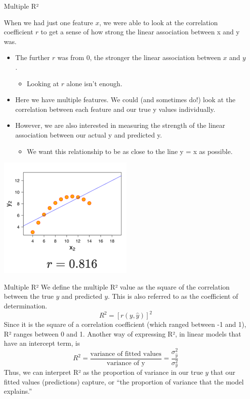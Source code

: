 \documentclass[aspectratio=169]{../latex_main/tntbeamer}  %
\begin{document}
	\begin{frame}{Multiple R²}
	
	    When we had just one feature $x$, we were able to look at the correlation coefficient $r$ to get a sense of how strong the linear association between x and y was. 
	    
	    \begin{itemize}
	        \item The further $r$ was from 0, the stronger the linear association between $x$ and $y$.
	        \begin{itemize}
	            \item Looking at $r$ alone isn’t enough. 
	        \end{itemize}
	        \item Here we have multiple features. We could (and sometimes do!) look at the correlation between each feature and our true y values individually.
	        \item However, we are also interested in measuring the strength of the linear association between our actual y and predicted y.
	        \begin{itemize}
	            \item We want this relationship to be as close to the line y = x as possible.
	        \end{itemize}
	    \end{itemize}
	    
	        \centering
	        \includegraphics[scale=.4]{Bild13}
	   
	\end{frame}
	
	
	\begin{frame}{Multiple R²}
	   We define the multiple R² value as the square of the correlation between the true $y$ and predicted $y$. This is also referred to as the coefficient of determination.
	    \begin{equation*}
	        R^2 = [r(y,\hat{y})]^2
	    \end{equation*}
	    Since it is the square of a correlation coefficient (which ranged between -1 and 1), R² ranges between 0 and 1. Another way of expressing R², in linear models that have an intercept term, is
        \begin{equation*}
	        R^2 = \frac{\text{variance of fitted values}}{\text{variance of y}} = \frac{\sigma_{\hat{y}}^2}{\sigma_{y}^2}
	    \end{equation*}
	   Thus, we can interpret R² as the proportion of variance in our true $y$ that our fitted values (predictions) capture, or “the proportion of variance that the model explains.”
	\end{frame}
	
\end{document}
